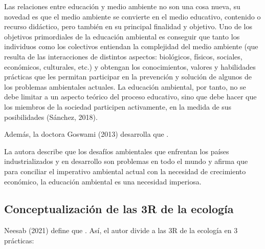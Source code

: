 Las relaciones entre educación y medio ambiente no son una cosa nueva, su novedad es que el medio ambiente se convierte en el medio educativo, contenido o recurso didáctico, pero también en su principal finalidad y objetivo. Uno de los objetivos primordiales de la educación ambiental es conseguir que tanto los individuos como los colectivos entiendan la complejidad del medio ambiente (que resulta de las interacciones de distintos aspectos: biológicos, físicos, sociales, económicos, culturales, etc.) y obtengan los conocimientos, valores y habilidades prácticas que les permitan participar en la prevención y solución de algunos de los problemas ambientales actuales. La educación ambiental, por tanto, no se debe limitar a un aspecto teórico del proceso educativo, sino que debe hacer que los miembros de la sociedad participen activamente, en la medida de sus posibilidades (Sánchez, 2018).

Además, la doctora Goswami (2013) desarrolla que .

La autora describe que los desafíos ambientales que enfrentan los países industrializados y en desarrollo son problemas  en todo el mundo y afirma que para conciliar el imperativo ambiental actual con la necesidad de crecimiento económico, la educación ambiental es una necesidad imperiosa.

{\setlength{\parskip}{0cm}
\subsection{Conceptualización de las 3R de la ecología}

Neesab (2021) define que . Así, el autor divide a las 3R de la ecología en 3 prácticas:
}

